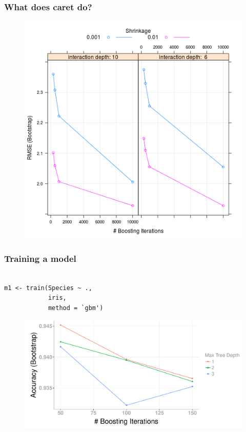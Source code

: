 \documentclass[handout, aspectratio = 169]{beamer}
\begin{document}
\begin{frame}
\frametitle{What does caret do?}
\begin{figure}
    \includegraphics[height = 0.8\textheight]{gbm2opt}
\end{figure} 
\end{frame} 






\begin{frame}[fragile]
\frametitle{Training a model}
\begin{Verbatim}

m1 <- train(Species ~ ., 
            iris,
            method = `gbm')

\end{Verbatim}

\begin{figure}
    \includegraphics[height = 0.5\textheight]{train_gbm}
\end{figure} 
\end{frame} 
\end{document}
